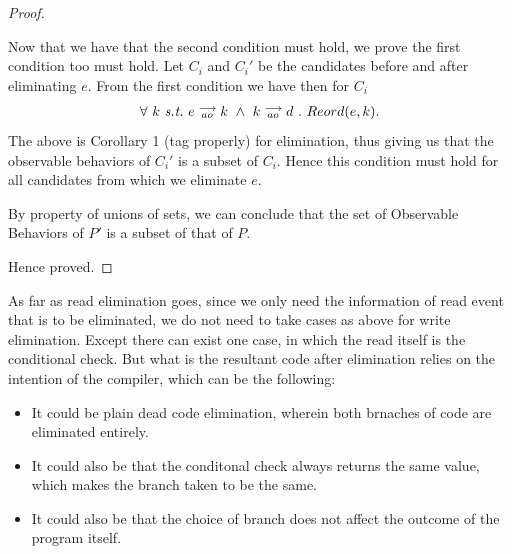 \begin{proof}
\begin{itemize}

            \end{itemize}

            Now that we have that the second condition must hold, we prove the first condition too must hold. Let $C_i$ and $C_i'$ be the candidates before and after eliminating $e$. From the first condition we have then for $C_i$
            \begin{align*}
                \forall \ k \ \textit{s.t.} \ 
                \reln{e}{ao}{k} \ \wedge \ \reln{k}{ao}{d} \ . \ 
                Reord(e,k).
            \end{align*}
            The above is Corollary 1 (tag properly) for elimination, thus giving us that the observable behaviors of $C_i'$ is a subset of $C_i$. Hence this condition must hold for all candidates from which we eliminate $e$. 

            By property of unions of sets, we can conclude that the set of Observable Behaviors of $P'$ is a subset of that of $P$.

            Hence proved.

    \end{proof}

        As far as read elimination goes, since we only need the information of read event that is to be eliminated, we do not need to take cases as above for write elimination. Except there can exist one case, in which the read itself is the conditional check. But what is the resultant code after elimination relies on the intention of the compiler, which can be the following:
        \begin{itemize}
            \item It could be plain dead code elimination, wherein both brnaches of code are eliminated entirely. 
            \item It could also be that the conditonal check always returns the same value, which makes the branch taken to be the same. 
            \item It could also be that the choice of branch does not affect the outcome of the program itself. 
        \end{itemize}
    
